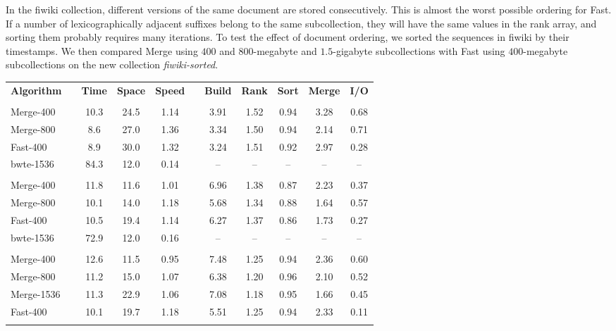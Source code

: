 In the fiwiki collection, different versions of the same document are stored consecutively. This is almost the worst possible ordering for Fast. If a number of lexicographically adjacent suffixes belong to the same subcollection, they will have the same values in the rank array, and sorting them probably requires many iterations. To test the effect of document ordering, we sorted the sequences in fiwiki by their timestamps. We then compared Merge using $400$ and $800$\nobreakdash-megabyte and $1.5$\nobreakdash-gigabyte subcollections with Fast using $400$\nobreakdash-megabyte subcollections on the new collection \emph{fiwiki-sorted}.

\begin{table}
\centering
\renewcommand{\tabcolsep}{.1cm}
\begin{tabular}{lcccccccccc}
\hline\noalign{\smallskip}
\textbf{Algorithm} & & \textbf{Time} & \textbf{Space} & \textbf{Speed} & & \textbf{Build} & \textbf{Rank} & \textbf{Sort} & \textbf{Merge} & \textbf{I/O} \\

\noalign{\smallskip}
\hline
\noalign{\smallskip}
\multicolumn{10}{l}{\textbf{enwiki}} \\
Merge-400  & & 10.3 & 24.5 & 1.14 & & 3.91 & 1.52 & 0.94 & 3.28 & 0.68 \\
Merge-800  & &  8.6 & 27.0 & 1.36 & & 3.34 & 1.50 & 0.94 & 2.14 & 0.71 \\
Fast-400   & &  8.9 & 30.0 & 1.32 & & 3.24 & 1.51 & 0.92 & 2.97 & 0.28 \\
bwte-1536  & & 84.3 & 12.0 & 0.14 & & --   & --   & --   & --   & --   \\
\noalign{\smallskip}
\multicolumn{10}{l}{\textbf{fiwiki}} \\
Merge-400  & & 11.8 & 11.6 & 1.01 & & 6.96 & 1.38 & 0.87 & 2.23 & 0.37 \\
Merge-800  & & 10.1 & 14.0 & 1.18 & & 5.68 & 1.34 & 0.88 & 1.64 & 0.57 \\
Fast-400   & & 10.5 & 19.4 & 1.14 & & 6.27 & 1.37 & 0.86 & 1.73 & 0.27 \\
bwte-1536  & & 72.9 & 12.0 & 0.16 & & --   & --   & --   & --   & --   \\
\noalign{\smallskip}
\multicolumn{10}{l}{\textbf{fiwiki-sorted}} \\
Merge-400  & & 12.6 & 11.5 & 0.95 & & 7.48 & 1.25 & 0.94 & 2.36 & 0.60 \\
Merge-800  & & 11.2 & 15.0 & 1.07 & & 6.38 & 1.20 & 0.96 & 2.10 & 0.52 \\ 
Merge-1536 & & 11.3 & 22.9 & 1.06 & & 7.08 & 1.18 & 0.95 & 1.66 & 0.45 \\
Fast-400   & & 10.1 & 19.7 & 1.18 & & 5.51 & 1.25 & 0.94 & 2.33 & 0.11 \\
\noalign{\smallskip}
\hline
\end{tabular}


\end{table}

